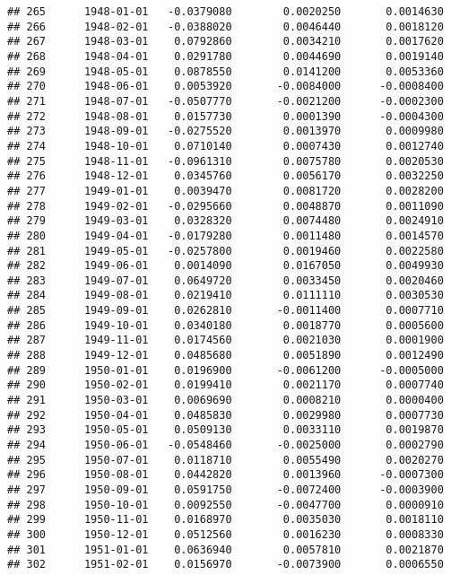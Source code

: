 \documentclass[
]{article}
\begin{document}
\begin{verbatim}
## 265      1948-01-01   -0.0379080        0.0020250       0.0014630
## 266      1948-02-01   -0.0388020        0.0046440       0.0018120
## 267      1948-03-01    0.0792860        0.0034210       0.0017620
## 268      1948-04-01    0.0291780        0.0044690       0.0019140
## 269      1948-05-01    0.0878550        0.0141200       0.0053360
## 270      1948-06-01    0.0053920       -0.0084000      -0.0008400
## 271      1948-07-01   -0.0507770       -0.0021200      -0.0002300
## 272      1948-08-01    0.0157730        0.0001390      -0.0004300
## 273      1948-09-01   -0.0275520        0.0013970       0.0009980
## 274      1948-10-01    0.0710140        0.0007430       0.0012740
## 275      1948-11-01   -0.0961310        0.0075780       0.0020530
## 276      1948-12-01    0.0345760        0.0056170       0.0032250
## 277      1949-01-01    0.0039470        0.0081720       0.0028200
## 278      1949-02-01   -0.0295660        0.0048870       0.0011090
## 279      1949-03-01    0.0328320        0.0074480       0.0024910
## 280      1949-04-01   -0.0179280        0.0011480       0.0014570
## 281      1949-05-01   -0.0257800        0.0019460       0.0022580
## 282      1949-06-01    0.0014090        0.0167050       0.0049930
## 283      1949-07-01    0.0649720        0.0033450       0.0020460
## 284      1949-08-01    0.0219410        0.0111110       0.0030530
## 285      1949-09-01    0.0262810       -0.0011400       0.0007710
## 286      1949-10-01    0.0340180        0.0018770       0.0005600
## 287      1949-11-01    0.0174560        0.0021030       0.0001900
## 288      1949-12-01    0.0485680        0.0051890       0.0012490
## 289      1950-01-01    0.0196900       -0.0061200      -0.0005000
## 290      1950-02-01    0.0199410        0.0021170       0.0007740
## 291      1950-03-01    0.0069690        0.0008210       0.0000400
## 292      1950-04-01    0.0485830        0.0029980       0.0007730
## 293      1950-05-01    0.0509130        0.0033110       0.0019870
## 294      1950-06-01   -0.0548460       -0.0025000       0.0002790
## 295      1950-07-01    0.0118710        0.0055490       0.0020270
## 296      1950-08-01    0.0442820        0.0013960      -0.0007300
## 297      1950-09-01    0.0591750       -0.0072400      -0.0003900
## 298      1950-10-01    0.0092550       -0.0047700       0.0000910
## 299      1950-11-01    0.0168970        0.0035030       0.0018110
## 300      1950-12-01    0.0512560        0.0016230       0.0008330
## 301      1951-01-01    0.0636940        0.0057810       0.0021870
## 302      1951-02-01    0.0156970       -0.0073900       0.0006550

\end{verbatim}
\end{document}

